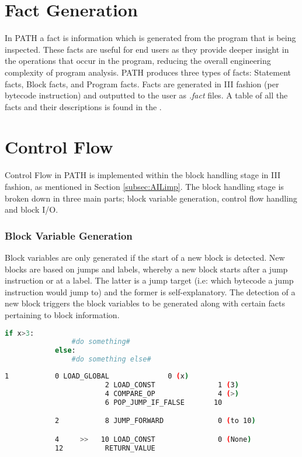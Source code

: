             
    \section{Fact Generation} \label{sec:factgen}
    \par In \acs{PATH} a fact is information which is generated from the program that is being inspected. These facts are useful for end users as they provide deeper insight in the operations that occur in the program, reducing the overall engineering complexity of program analysis. \acs{PATH} produces three types of facts: Statement facts, Block facts, and Program facts.
    Facts are generated in \acs{III} fashion (per bytecode instruction) and outputted to the user as \textit{.fact} files. A table of all the facts and their descriptions is found in the . 

    \section{Control Flow} \label{sec:cfimp}
    \par Control Flow in \acs{PATH} is implemented within the block handling stage in \acs{III} fashion, as mentioned in Section \ref{subsec:AILimp}. The block handling stage is broken down in three main parts; block variable generation, control flow handling and block \acs{I/O}.
        \subsubsection*{Block Variable Generation}
        \par Block variables are only generated if the start of a new block is detected. New blocks are based on jumps and labels, whereby a new block starts after a jump instruction or at a label. The latter is a jump target (i.e: which bytecode a jump instruction would jump to) and the former is self-explanatory. 
        The detection of a new block triggers the block variables to be generated along with certain facts pertaining to block information.    
        

        \begin{lstlisting}[language=Python,caption= Conditional statement script]
            if x>3:
                #do something#
            else:
                #do something else#
        \end{lstlisting}\label{lst:condscriptLIst}
        \begin{lstlisting}[language=bash,caption= Bytecode Dissasmbly of Listing \ref{lst:condscriptLIst},numbers=none]
            1           0 LOAD_GLOBAL              0 (x)
                        2 LOAD_CONST               1 (3)
                        4 COMPARE_OP               4 (>)
                        6 POP_JUMP_IF_FALSE       10

            2           8 JUMP_FORWARD             0 (to 10)

            4     >>   10 LOAD_CONST               0 (None)
            12          RETURN_VALUE
        \end{lstlisting}

